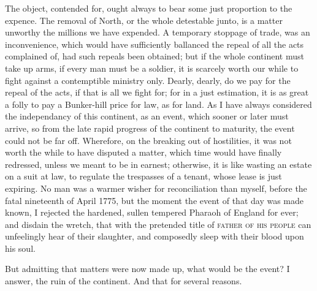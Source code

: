 \documentclass[12pt, twocolumn]{book}
\begin{document}
    The object, contended for, ought always to bear some just proportion to the expence. The removal of North, or the whole detestable junto, is a matter unworthy the millions we have expended. A temporary stoppage of trade, was an inconvenience, which would have sufficiently ballanced the repeal of all the acts complained of, had such repeals been obtained; but if the whole continent must take up arms, if every man must be a soldier, it is scarcely worth our while to fight against a contemptible ministry only. Dearly, dearly, do we pay for the repeal of the acts, if that is all we fight for; for in a just estimation, it is as great a folly to pay a Bunker-hill price for law, as for land. As I have always considered the independancy of this continent, as an event, which sooner or later must arrive, so from the late rapid progress of the continent to maturity, the event could not be far off. Wherefore, on the breaking out of hostilities, it was not worth the while to have disputed a matter, which time would have finally redressed, unless we meant to be in earnest; otherwise, it is like wasting an estate on a suit at law, to regulate the trespasses of a tenant, whose lease is just expiring. No man was a warmer wisher for reconciliation than myself, before the fatal nineteenth of April 1775, but the moment the event of that day was made known, I rejected the hardened, sullen tempered Pharaoh of England for ever; and disdain the wretch, that with the pretended title of \textsc{father of his people} can unfeelingly hear of their slaughter, and composedly sleep with their blood upon his soul.

    But admitting that matters were now made up, what would be the event? I answer, the ruin of the continent. And that for several reasons.
    
    \bigskip
    
\end{document}
